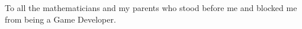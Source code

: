 
To all the mathematicians and my parents who stood before me and blocked me from being a Game Developer.